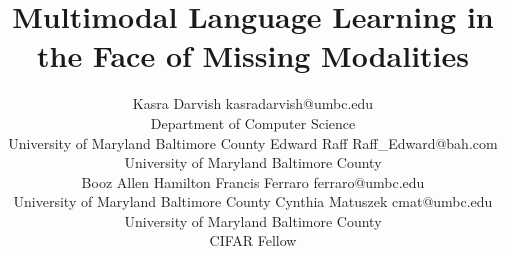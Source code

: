 \documentclass[10pt]{article} %
\title{Multimodal Language Learning in the Face of Missing Modalities}
\author{\name Kasra Darvish \email kasradarvish@umbc.edu \\
      \addr Department of Computer Science\\
      University of Maryland Baltimore County
      \AND
      \name Edward Raff \email Raff\_Edward@bah.com \\
      \addr University of Maryland Baltimore County \\
      Booz Allen Hamilton
      \AND
      \name Francis Ferraro \email ferraro@umbc.edu \\
      \addr University of Maryland Baltimore County
      \AND
      \name Cynthia Matuszek \email cmat@umbc.edu\\
      \addr University of Maryland Baltimore County \\
      CIFAR Fellow}
\begin{document}
\maketitle



\begin{abstract}

    

\end{abstract}
\end{document}
